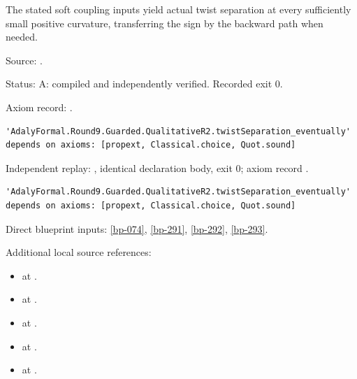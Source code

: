 \begin{theorem}[bp-294]
\label{bp-294}
\leanok
The stated soft coupling inputs yield actual twist separation at every sufficiently small positive curvature, transferring the sign by the backward path when needed.

\par Source: \texttt{}.
\par Status: A: compiled and independently verified. Recorded exit 0.
\par Axiom record: \texttt{}.
\begin{verbatim}
'AdalyFormal.Round9.Guarded.QualitativeR2.twistSeparation_eventually' depends on axioms: [propext, Classical.choice, Quot.sound]
\end{verbatim}
\par Independent replay: \texttt{}, identical declaration body, exit 0; axiom record \texttt{}.
\begin{verbatim}
'AdalyFormal.Round9.Guarded.QualitativeR2.twistSeparation_eventually' depends on axioms: [propext, Classical.choice, Quot.sound]
\end{verbatim}
\par Direct blueprint inputs: \ref{bp-074}, \ref{bp-291}, \ref{bp-292}, \ref{bp-293}.
\par Additional local source references:
\begin{itemize}
\item \texttt{} at \texttt{}.
\item \texttt{} at \texttt{}.
\item \texttt{} at \texttt{}.
\item \texttt{} at \texttt{}.
\item \texttt{} at \texttt{}.

\end{itemize}
\end{theorem}
